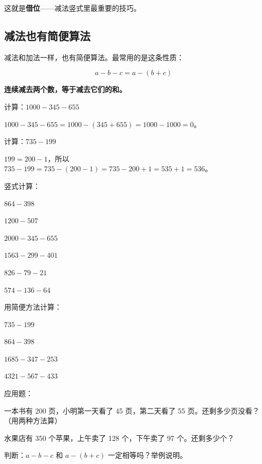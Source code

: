 这就是\textbf{借位}——减法竖式里最重要的技巧。

\subsection*{减法也有简便算法}

减法和加法一样，也有简便算法。最常用的是这条性质：

\[
a-b-c = a-(b+c)
\]

\textbf{连续减去两个数，等于减去它们的和。}

\begin{example}
计算：$1000-345-655$
\end{example}
\begin{solution}
$1000-345-655 = 1000-(345+655) = 1000-1000 = 0$。
\end{solution}

\begin{example}
计算：$735-199$
\end{example}
\begin{solution}
$199 = 200-1$，所以
$735-199 = 735-(200-1) = 735-200+1 = 535+1 = 536$。
\end{solution}

\begin{exercise}
\item 竖式计算：
  \begin{subexercise}
    \item $864-398$
    \item $1200-507$
    \item $2000-345-655$
    \item $1563-299-401$
    \item $826-79-21$
    \item $574-136-64$
  \end{subexercise}

\item 用简便方法计算：
  \begin{subexercise}
    \item $735-199$
    \item $864-398$
    \item $1685-347-253$
    \item $4321-567-433$
  \end{subexercise}

\item 应用题：
  \begin{subexercise}
    \item 一本书有 200 页，小明第一天看了 45 页，第二天看了 55 页。还剩多少页没看？（用两种方法算）
    \item 水果店有 350 个苹果，上午卖了 128 个，下午卖了 97 个。还剩多少个？
  \end{subexercise}

\item 判断：$a-b-c$ 和 $a-(b+c)$ 一定相等吗？举例说明。
\end{exercise}

